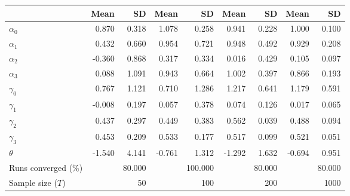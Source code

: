 
\begin{tabular}[t]{lrrrrrrrr}
\toprule
  & Mean & SD & Mean  & SD  & Mean   & SD   & Mean    & SD   \\
\midrule
$\alpha_{0}$ & 0.870 & 0.318 & 1.078 & 0.258 & 0.941 & 0.228 & 1.000 & 0.100\\
$\alpha_{1}$ & 0.432 & 0.660 & 0.954 & 0.721 & 0.948 & 0.492 & 0.929 & 0.208\\
$\alpha_{2}$ & -0.360 & 0.868 & 0.317 & 0.334 & 0.016 & 0.429 & 0.105 & 0.097\\
$\alpha_{3}$ & 0.088 & 1.091 & 0.943 & 0.664 & 1.002 & 0.397 & 0.866 & 0.193\\
$\gamma_{0}$ & 0.767 & 1.121 & 0.710 & 1.286 & 1.217 & 0.641 & 1.179 & 0.591\\
$\gamma_{1}$ & -0.008 & 0.197 & 0.057 & 0.378 & 0.074 & 0.126 & 0.017 & 0.065\\
$\gamma_{2}$ & 0.437 & 0.297 & 0.449 & 0.383 & 0.562 & 0.039 & 0.488 & 0.094\\
$\gamma_{3}$ & 0.453 & 0.209 & 0.533 & 0.177 & 0.517 & 0.099 & 0.521 & 0.051\\
$\theta$ & -1.540 & 4.141 & -0.761 & 1.312 & -1.292 & 1.632 & -0.694 & 0.951\\
Runs converged (\%) &  & 80.000 &  & 100.000 &  & 80.000 &  & 80.000\\
Sample size ($T$) &  & 50 &  & 100 &  & 200 &  & 1000\\
\bottomrule
\end{tabular}
